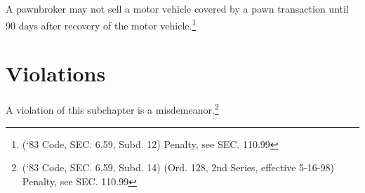 \subsection{}
A pawnbroker may not sell a motor vehicle covered by a pawn transaction until 90 days after recovery of the motor vehicle.\footnote{(‘83 Code, SEC. 6.59, Subd. 12)  Penalty, see SEC. 110.99}

\section{Violations}
A violation of this subchapter is a misdemeanor.\footnote{(‘83 Code, SEC. 6.59, Subd. 14)  (Ord. 128, 2nd Series, effective 5-16-98)  Penalty, see SEC. 110.99}
